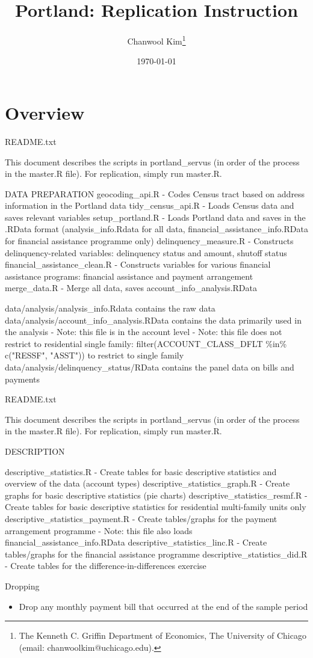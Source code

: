 \documentclass[12pt]{article}
\begin{document}
\title{Portland: Replication Instruction}
\author{Chanwool Kim\thanks{The Kenneth C. Griffin Department of Economics, The University of Chicago (email: chanwoolkim@uchicago.edu).}}
\date{\today}
\maketitle

\section*{Overview}
README.txt

This document describes the scripts in portland\_servus (in order of the process in the master.R file). For replication, simply run master.R.


DATA PREPARATION
geocoding\_api.R
- Codes Census tract based on address information in the Portland data
tidy\_census\_api.R
- Loads Census data and saves relevant variables
setup\_portland.R
- Loads Portland data and saves in the .RData format (analysis\_info.Rdata for all data, financial\_assistance\_info.RData for financial assistance programme only)
delinquency\_measure.R
- Constructs delinquency-related variables: delinquency status and amount, shutoff status
financial\_assistance\_clean.R
- Constructs variables for various financial assistance programs: financial assistance and payment arrangement
merge\_data.R
- Merge all data, saves account\_info\_analysis.RData

data/analysis/analysis\_info.Rdata contains the raw data
data/analysis/account\_info\_analysis.RData contains the data primarily used in the analysis
- Note: this file is in the account level
- Note: this file does not restrict to residential single family: filter(ACCOUNT\_CLASS\_DFLT \%in\% c("RESSF", "ASST")) to restrict to single family
data/analysis/delinquency\_status/RData contains the panel data on bills and payments




README.txt

This document describes the scripts in portland\_servus (in order of the process in the master.R file). For replication, simply run master.R.


DESCRIPTION

descriptive\_statistics.R
- Create tables for basic descriptive statistics and overview of the data (account types)
descriptive\_statistics\_graph.R
- Create graphs for basic descriptive statistics (pie charts)
descriptive\_statistics\_resmf.R
- Create tables for basic descriptive statistics for residential multi-family units only
descriptive\_statistics\_payment.R
- Create tables/graphs for the payment arrangement programme
- Note: this file also loads financial\_assistance\_info.RData
descriptive\_statistics\_linc.R
- Create tables/graphs for the financial assistance programme
descriptive\_statistics\_did.R
- Create tables for the difference-in-differences exercise



Dropping
\begin{itemize}
	\item Drop any monthly payment bill that occurred at the end of the sample period
\end{itemize}
\end{document}

